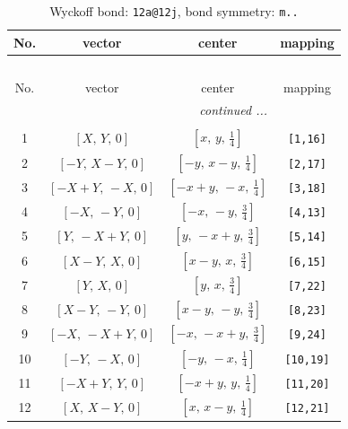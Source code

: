 \documentclass[fleqn,8pt]{jsarticle}
\begin{document}
\begin{longtable}{cccc}
\caption{Wyckoff bond: {\tt 12a@12j}, bond symmetry: {\tt m..}}
 \\
 \hline \hline
No. & vector & center & mapping \\ \hline \endfirsthead

\multicolumn{3}{l}{\tablename\ \thetable{}} \\
 \hline \hline
No. & vector & center & mapping \\ \hline \endhead

 \hline \hline
\multicolumn{3}{r}{\footnotesize\it continued ...} \\ \endfoot

 \hline \hline
\multicolumn{3}{r}{} \\ \endlastfoot

1 & $\left[ X,\, Y,\, 0 \right]$ & $\left[ x,\, y,\, \frac{1}{4} \right]$ & {\tt [1,16]} \\ \hline
2 & $\left[ - Y,\, X - Y,\, 0 \right]$ & $\left[ - y,\, x - y,\, \frac{1}{4} \right]$ & {\tt [2,17]} \\ \hline
3 & $\left[ - X + Y,\, - X,\, 0 \right]$ & $\left[ - x + y,\, - x,\, \frac{1}{4} \right]$ & {\tt [3,18]} \\ \hline
4 & $\left[ - X,\, - Y,\, 0 \right]$ & $\left[ - x,\, - y,\, \frac{3}{4} \right]$ & {\tt [4,13]} \\ \hline
5 & $\left[ Y,\, - X + Y,\, 0 \right]$ & $\left[ y,\, - x + y,\, \frac{3}{4} \right]$ & {\tt [5,14]} \\ \hline
6 & $\left[ X - Y,\, X,\, 0 \right]$ & $\left[ x - y,\, x,\, \frac{3}{4} \right]$ & {\tt [6,15]} \\ \hline
7 & $\left[ Y,\, X,\, 0 \right]$ & $\left[ y,\, x,\, \frac{3}{4} \right]$ & {\tt [7,22]} \\ \hline
8 & $\left[ X - Y,\, - Y,\, 0 \right]$ & $\left[ x - y,\, - y,\, \frac{3}{4} \right]$ & {\tt [8,23]} \\ \hline
9 & $\left[ - X,\, - X + Y,\, 0 \right]$ & $\left[ - x,\, - x + y,\, \frac{3}{4} \right]$ & {\tt [9,24]} \\ \hline
10 & $\left[ - Y,\, - X,\, 0 \right]$ & $\left[ - y,\, - x,\, \frac{1}{4} \right]$ & {\tt [10,19]} \\ \hline
11 & $\left[ - X + Y,\, Y,\, 0 \right]$ & $\left[ - x + y,\, y,\, \frac{1}{4} \right]$ & {\tt [11,20]} \\ \hline
12 & $\left[ X,\, X - Y,\, 0 \right]$ & $\left[ x,\, x - y,\, \frac{1}{4} \right]$ & {\tt [12,21]} \\
\end{longtable}
\end{document}
